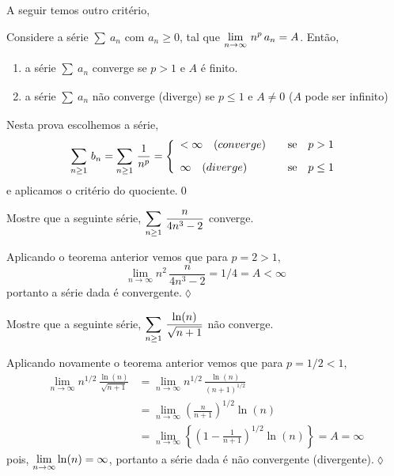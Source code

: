 A seguir temos outro crit\'{e}rio,
\begin{theoc}{}{}
Considere a s\'{e}rie $\sum_{}\,a_{n}$ com $a_n\ge 0$, tal que
$\displaystyle{\lim_{n\to\infty}\,n^p\,a_n=A}$. Ent\~{a}o,
\begin{enumerate}[label=\rm{(\alph*)},leftmargin=4em,ref=\rm{(\alph*)}]
\item a s\'{e}rie $\sum_{}\,a_{n}$ converge se $p>1$ e $A$ \'{e} finito.
\item a s\'{e}rie $\sum_{}\,a_{n}$ n\~{a}o converge (diverge) se $p\leq 1$ e $A\neq 0$ ($A$ pode ser infinito)
\end{enumerate}
\end{theoc}

\begin{prvc}{}{}
Nesta prova escolhemos a s\'{e}rie,
\begin{equation*}
\sum_{n\geq1}\,b_n=\sum_{n\geq1}\,\frac{1}{n^p}=
\left\{
  \begin{array}{ll}
    <\infty \quad (converge)&\quad  \hbox{se}\quad p>1 \\[2ex]
    \infty \quad (diverge) &\quad  \hbox{se}\quad p\le 1
  \end{array}
\right.
\end{equation*}
e aplicamos o crit\'{e}rio do quociente.\qed
\end{prvc}

\begin{exer}
Mostre que a seguinte s\'{e}rie, $\displaystyle{\sum_{n\geq
1}\,\frac{n}{4n^3-2}}$ converge.
\end{exer}

\solo Aplicando o teorema anterior vemos que para $p=2>1$,
\begin{equation*}
  \lim_{n\to\infty}n^2\,\frac{n}{4n^3-2}=1/4=A<\infty
\end{equation*}
portanto a s\'{e}rie dada \'{e} convergente.\hfill \(\lozenge\)

\begin{exer}
Mostre que a seguinte s\'{e}rie, $\displaystyle{\sum_{n\geq1}\,\frac{\ln
(n)}{\sqrt{n+1}}}$ n\~{a}o converge.
\end{exer}

\solo Aplicando novamente o teorema anterior vemos que para
$p=1/2<1$,
\begin{align*}
  \lim_{n\to\infty}n^{1/2}\,\frac{\ln(n)}{\sqrt{n+1}}&= \lim_{n\to\infty}n^{1/2}\,
  \frac{\ln (n)}{(n+1)^{1/2}}\\
  &=\lim_{n\to\infty}\left(\frac{n}{n+1}\right)^{1/2}\ln(n)\\
  &=\lim_{n\to\infty}\left\{\left(1-\frac{1}{n+1}\right)^{1/2}\ln(n) \right\}=A=\infty
\end{align*}
pois, $\displaystyle{\lim_{n\to\infty}\ln(n)=\infty}$, portanto a s\'{e}rie
dada \'{e} n\~{a}o convergente (divergente).\hfill \(\lozenge\)

